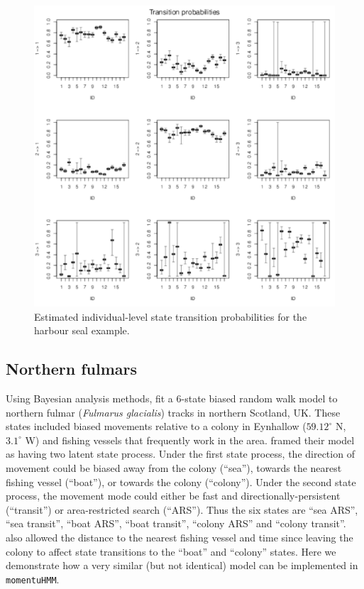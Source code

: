 \documentclass[12pt]{article}\usepackage[]{graphicx}\usepackage[]{xcolor}
\begin{document}
\begin{figure}[htbp]
  \centering
  \includegraphics[width=\textwidth]{plot_harbourSealResults020}
  \caption{Estimated individual-level state transition probabilities for the harbour seal example.}
  \label{fig:hsTPM}
\end{figure}

\subsection{Northern fulmars}
\label{sec:northernFulmar}
Using Bayesian analysis methods, \cite{PirottaEtAl2018} fit a 6-state biased random walk model to northern fulmar ({\it Fulmarus glacialis}) tracks in northern Scotland, UK.  These states included biased movements relative to a colony in Eynhallow ($59.12^\circ$ N, $3.1^\circ$ W) and fishing vessels that frequently work in the area.  \cite{PirottaEtAl2018} framed their model as having two latent state process.  Under the first state process, the direction of movement could be biased away from the colony (``sea''), towards the nearest fishing vessel (``boat''), or towards the colony (``colony''). Under the second state process, the movement mode could either be fast and directionally-persistent (``transit'') or area-restricted search (``ARS'').  Thus the six states are ``sea ARS'', ``sea transit'', ``boat ARS'', ``boat transit'', ``colony ARS'' and ``colony transit''. \cite{PirottaEtAl2018} also allowed the distance to the nearest fishing vessel and time since leaving the colony to affect state transitions to the ``boat'' and ``colony'' states.  Here we demonstrate how a very similar (but not identical) model can be implemented in \verb|momentuHMM|.
\end{document}
